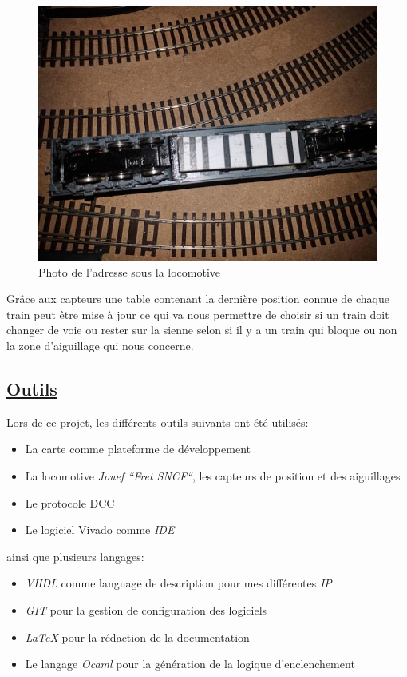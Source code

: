 \begin{figure}[h]
\centering
\includegraphics[scale=0.27]{add.jpg}
\caption{Photo de l'adresse sous la locomotive}
\label{fig6}
\end{figure}

Grâce aux capteurs une table contenant la
dernière position connue de chaque train peut être mise à jour ce qui va nous permettre de
choisir si un train doit changer de voie ou rester sur la sienne selon
si il y a un train qui bloque ou non la zone d'aiguillage qui nous concerne.


\subsection{\underline{Outils}}
\label{sec:outils}

Lors de ce projet, les diff\'erents outils suivants ont été utilisés:
\begin{itemize}
  \item La carte \crt comme plateforme de d\'eveloppement
  \item La locomotive \emph{Jouef ``Fret SNCF``}\cite{Jouef}, les capteurs de
    position et des aiguillages
  \item Le protocole DCC \cite{DCC}
  \item Le logiciel Vivado comme \emph{IDE}
\end{itemize}

ainsi que plusieurs langages:
\begin{itemize}
  \item \emph{VHDL}\cite{VHDL} comme language de description pour mes diff\'erentes
    \emph{IP}
  \item \emph{GIT}\cite{GIT} pour la gestion de configuration des logiciels
  \item \emph{\LaTeX}\cite{LATEX} pour la r\'edaction de la documentation
  \item Le langage \emph{Ocaml}\cite{OCAML} pour la g\'en\'eration de la logique d'enclenchement
\end{itemize}

